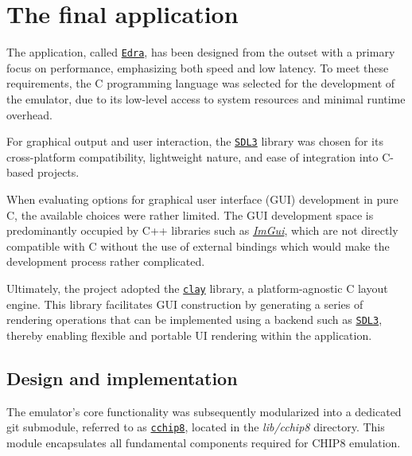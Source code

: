 \chapter{The final application}
\label{chap:ch4}

\par The application, called \href{https://github.com/solomonarul/edra}{\texttt{Edra}}, has been designed from the outset with a primary focus on performance, emphasizing both speed and low latency. To meet these requirements, the C programming language was selected for the development of the emulator, due to its low-level access to system resources and minimal runtime overhead.

\par For graphical output and user interaction, the \href{https://wiki.libsdl.org/SDL3/FrontPage}{\texttt{SDL3}} library was chosen for its cross-platform compatibility, lightweight nature, and ease of integration into C-based projects.

\par When evaluating options for graphical user interface (GUI) development in pure C, the available choices were rather limited. The GUI development space is predominantly occupied by C++ libraries such as \href{https://github.com/ocornut/imgui}{\textit{ImGui}}, which are not directly compatible with C without the use of external bindings which would make the development process rather complicated.

\par Ultimately, the project adopted the \href{https://github.com/nicbarker/clay}{\texttt{clay}} library, a platform-agnostic C layout engine. This library facilitates GUI construction by generating a series of rendering operations that can be implemented using a backend such as \href{https://wiki.libsdl.org/SDL3/FrontPage}{\texttt{SDL3}}, thereby enabling flexible and portable UI rendering within the application.

\section{Design and implementation}
\label{sec:ch4sec1}

\par The emulator's core functionality was subsequently modularized into a dedicated git submodule, referred to as \href{https://github.com/solomonarul/cchip8}{\texttt{cchip8}}, located in the \textit{lib/cchip8} directory. This module encapsulates all fundamental components required for CHIP8 emulation.

